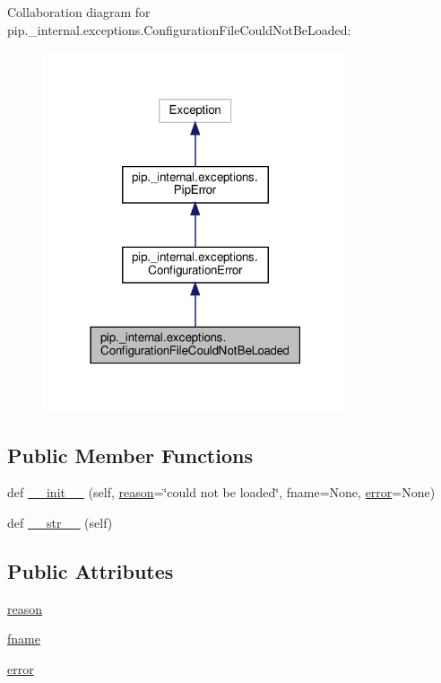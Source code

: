 Collaboration diagram for pip.\+\_\+internal.\+exceptions.\+Configuration\+File\+Could\+Not\+Be\+Loaded\+:
\nopagebreak
\begin{figure}[H]
\begin{center}
\leavevmode
\includegraphics[width=255pt]{classpip_1_1__internal_1_1exceptions_1_1ConfigurationFileCouldNotBeLoaded__coll__graph}
\end{center}
\end{figure}
\subsection*{Public Member Functions}
\begin{DoxyCompactItemize}
\item 
def \hyperlink{classpip_1_1__internal_1_1exceptions_1_1ConfigurationFileCouldNotBeLoaded_a0045978401ba98456e272bb20b6824cc}{\+\_\+\+\_\+init\+\_\+\+\_\+} (self, \hyperlink{classpip_1_1__internal_1_1exceptions_1_1ConfigurationFileCouldNotBeLoaded_a0ee2dc93510a29d6737509c48cda1bd9}{reason}=\char`\"{}could not be loaded\char`\"{}, fname=None, \hyperlink{classpip_1_1__internal_1_1exceptions_1_1ConfigurationFileCouldNotBeLoaded_a7f785d13aad9a24c4c81ef582dbb1060}{error}=None)
\item 
def \hyperlink{classpip_1_1__internal_1_1exceptions_1_1ConfigurationFileCouldNotBeLoaded_af781cb7e37df164401249bfbe3963bba}{\+\_\+\+\_\+str\+\_\+\+\_\+} (self)
\end{DoxyCompactItemize}
\subsection*{Public Attributes}
\begin{DoxyCompactItemize}
\item 
\hyperlink{classpip_1_1__internal_1_1exceptions_1_1ConfigurationFileCouldNotBeLoaded_a0ee2dc93510a29d6737509c48cda1bd9}{reason}
\item 
\hyperlink{classpip_1_1__internal_1_1exceptions_1_1ConfigurationFileCouldNotBeLoaded_ac57a8611c823ace69c15772eb1f62c13}{fname}
\item 
\hyperlink{classpip_1_1__internal_1_1exceptions_1_1ConfigurationFileCouldNotBeLoaded_a7f785d13aad9a24c4c81ef582dbb1060}{error}
\end{DoxyCompactItemize}


